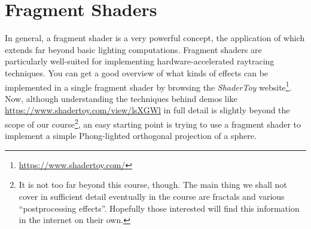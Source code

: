 \documentclass{article}
\begin{document}
\section{Fragment Shaders}
In general, a fragment shader is a very powerful concept, the application of which extends far beyond basic lighting computations. Fragment shaders are particularly well-suited for implementing hardware-accelerated raytracing techniques. You can get a good overview of what kinds of effects can be implemented in a single fragment shader by browsing the \emph{ShaderToy} website\footnote{\url{https://www.shadertoy.com/}}. Now, although understanding the techniques behind demos like \url{https://www.shadertoy.com/view/lsXGWl} in full detail is slightly beyond the scope of our course\footnote{It is not too far beyond this course, though. The main thing we shall not cover in sufficient detail eventually in the course are fractals and various ``postprocessing effects''. Hopefully those interested will find this information in the internet on their own.}, an easy starting point is trying to use a fragment shader to implement a simple Phong-lighted orthogonal projection of a sphere.
\end{document}
